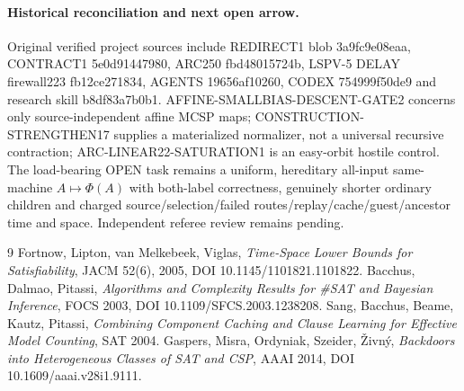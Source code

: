 \documentclass[11pt]{article}
\begin{document}
\paragraph{Historical reconciliation and next open arrow.}
Original verified project sources include REDIRECT1 blob 3a9fc9e08eaa, CONTRACT1 5e0d91447980, ARC250 fbd48015724b, LSPV-5 DELAY firewall223 fb12ce271834, AGENTS 19656af10260, CODEX 754999f50de9 and research skill b8df83a7b0b1. AFFINE-SMALLBIAS-DESCENT-GATE2 concerns only source-independent affine MCSP maps; CONSTRUCTION-STRENGTHEN17 supplies a materialized normalizer, not a universal recursive contraction; ARC-LINEAR22-SATURATION1 is an easy-orbit hostile control. The load-bearing OPEN task remains a uniform, hereditary all-input same-machine $A\mapsto\Phi(A)$ with both-label correctness, genuinely shorter ordinary children and charged source/selection/failed routes/replay/cache/guest/ancestor time and space. Independent referee review remains pending.

\begin{thebibliography}{9}
 Fortnow, Lipton, van Melkebeek, Viglas, \emph{Time-Space Lower Bounds for Satisfiability}, JACM 52(6), 2005, DOI 10.1145/1101821.1101822.
 Bacchus, Dalmao, Pitassi, \emph{Algorithms and Complexity Results for \#SAT and Bayesian Inference}, FOCS 2003, DOI 10.1109/SFCS.2003.1238208.
 Sang, Bacchus, Beame, Kautz, Pitassi, \emph{Combining Component Caching and Clause Learning for Effective Model Counting}, SAT 2004.
 Gaspers, Misra, Ordyniak, Szeider, \v{Z}ivn\'y, \emph{Backdoors into Heterogeneous Classes of SAT and CSP}, AAAI 2014, DOI 10.1609/aaai.v28i1.9111.
\end{thebibliography}
\end{document}
